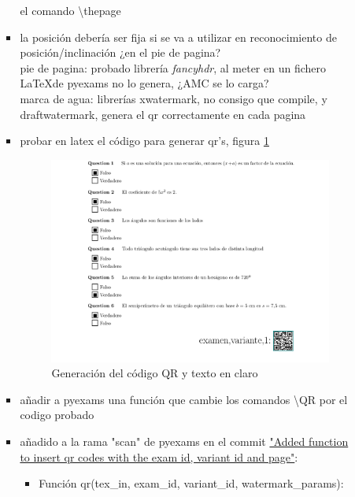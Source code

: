 \begin{itemize}
\begin{enumerate}
\begin{itemize}
            el comando \textbackslash{}thepage
            \item la posición debería ser fija si se va a utilizar en reconocimiento de posición/inclinación ¿en el pie de pagina?\\
            pie de pagina: probado librería \textit{fancyhdr}, al meter en un fichero \LaTeX de pyexams no lo genera, ¿AMC se lo carga?\\
            marca de agua: librerías xwatermark, no consigo que compile, y draftwatermark, genera el qr correctamente en cada pagina\\
            \item probar en latex el código para generar qr's, figura \ref{fig:watermark_qr_test}
            \begin{figure}
                \centering
                \includegraphics[width=\textwidth]{figures/watermark_qr_test.png}
                \caption{Generación del código QR y texto en claro}
                \label{fig:watermark_qr_test}
            \end{figure}
            \item añadir a pyexams una función que cambie los comandos \textbackslash{}QR por el codigo probado
            \item añadido a la rama "scan" de pyexams en el commit \href{https://framagit.org/pang/pyexams/-/commit/7a32d1f2a68f441a0100cf344400e2952eedd6d1}{"Added function to insert qr codes with the exam id, variant id and page"}: 
            \begin{itemize}
                \item Función qr(tex\_in, exam\_id, variant\_id, watermark\_params):\\

\end{itemize}
\end{itemize}
\end{enumerate}
\end{itemize}
